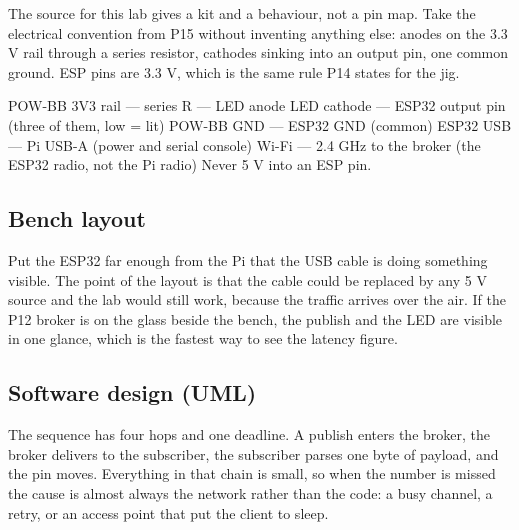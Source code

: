 The source for this lab gives a kit and a behaviour, not a pin map. Take the electrical convention from P15 without inventing anything else: anodes on the 3.3 V rail through a series resistor, cathodes sinking into an output pin, one common ground. ESP pins are 3.3 V, which is the same rule P14 states for the jig.

\begin{asciiart}
POW-BB 3V3 rail --- series R --- LED anode
LED cathode     --- ESP32 output pin        (three of them, low = lit)
POW-BB GND      --- ESP32 GND               (common)
ESP32 USB       --- Pi USB-A                (power and serial console)
Wi-Fi           --- 2.4 GHz to the broker   (the ESP32 radio, not the Pi radio)
Never 5 V into an ESP pin.
\end{asciiart}

\subsection*{Bench layout}


Put the ESP32 far enough from the Pi that the USB cable is doing something visible. The point of the layout is that the cable could be replaced by any 5 V source and the lab would still work, because the traffic arrives over the air. If the P12 broker is on the glass beside the bench, the publish and the LED are visible in one glance, which is the fastest way to see the latency figure.

\subsection*{Software design (UML)}


The sequence has four hops and one deadline. A publish enters the broker, the broker delivers to the subscriber, the subscriber parses one byte of payload, and the pin moves. Everything in that chain is small, so when the number is missed the cause is almost always the network rather than the code: a busy channel, a retry, or an access point that put the client to sleep.

